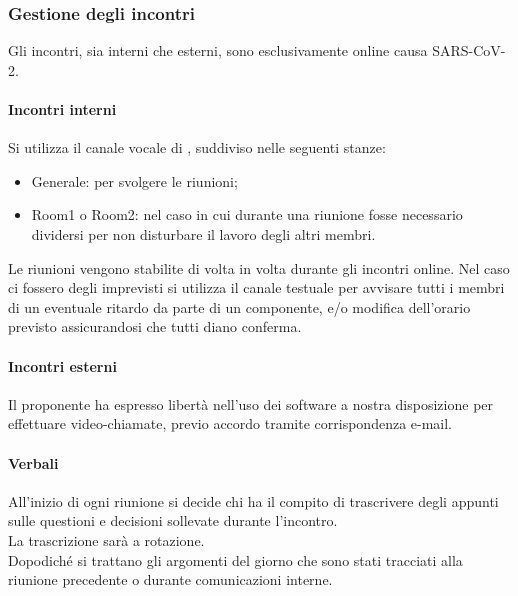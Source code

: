 		 \subsubsection{Gestione degli incontri}
		 Gli incontri, sia interni che esterni, sono esclusivamente online causa SARS-CoV-2.
		 \paragraph{Incontri interni}
		 Si utilizza il canale vocale di , suddiviso nelle seguenti stanze:
		 \begin{itemize}
		 	\item {\sffamily Generale}: per svolgere le riunioni;
		 	\item {\sffamily Room1} o {\sffamily Room2}: nel caso in cui durante una riunione fosse necessario dividersi per non disturbare il lavoro degli altri membri.
	 	  \end{itemize}
 		Le riunioni vengono stabilite di volta in volta durante gli incontri online.
 		Nel caso ci fossero degli imprevisti si utilizza il canale testuale per avvisare tutti i membri di un eventuale ritardo da parte di un componente, e/o modifica dell'orario previsto assicurandosi che tutti diano conferma.
		 \paragraph{Incontri esterni}
		 Il proponente ha espresso libertà nell'uso dei software a nostra disposizione per effettuare video-chiamate, previo accordo tramite corrispondenza e-mail.

		 \paragraph{Verbali}
		 All'inizio di ogni riunione si decide chi ha il compito di trascrivere degli appunti sulle questioni e decisioni sollevate durante l'incontro. \\
		 La trascrizione sarà a rotazione.\\
		 Dopodiché si trattano gli argomenti del giorno che sono stati tracciati alla riunione precedente o durante comunicazioni interne.

